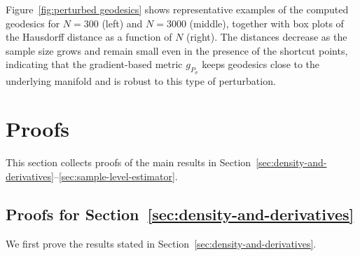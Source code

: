 \documentclass[11pt]{article}
\theoremstyle{plain}
\theoremstyle{definition}
\begin{document}
Figure~\ref{fig:perturbed geodesics} shows representative examples of the computed geodesics for $N = 300$ (left) and $N = 3000$ (middle), together with box plots of the Hausdorff distance as a function of $N$ (right). The distances decrease as the sample size grows and remain small even in the presence of the shortcut points, indicating that the gradient-based metric $g_{P_\sigma}$ keeps geodesics close to the underlying manifold and is robust to this type of perturbation.


\section{Proofs}\label{sec:proof}
This section collects proofs of the main results in Section~\ref{sec:density-and-derivatives}--\ref{sec:sample-level-estimator}.

\subsection{Proofs for Section~\ref{sec:density-and-derivatives}}
\label{sec:pf-density-derivative}
We first prove the results stated in Section~\ref{sec:density-and-derivatives}.
\end{document}
